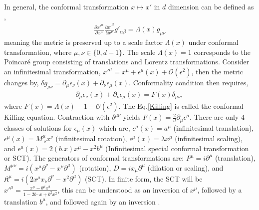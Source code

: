 \documentclass[%
 reprint,
superscriptaddress,
 amsmath,amssymb,
 aps,
]{revtex4-2}
\begin{document}
In general, the conformal transformation $x\longmapsto x'$ in $d$ dimension can be defined as \cite{Francesco,Blumenhagen}, 
\begin{align}
    \frac{\partial x'^{\alpha}}{\partial x^{\mu}}\frac{\partial x'^{\beta}}{\partial x^{\nu}}g'_{\alpha\beta}=\Lambda(x)g_{\mu\nu}
\end{align}
meaning the metric is preserved up to a scale factor $\Lambda(x)$ under conformal transformation, where $\mu,\nu\in\{0,d-1\}$. The scale $\Lambda(x)=1$ corresponds to the Poincar\'e group consisting of translations and Lorentz transformations. Consider an infinitesimal transformation, $x'^{\mu}=x^{\mu}+\epsilon^{\mu}(x)+\mathcal{O}(\epsilon^2)$, then the metric changes by, $\delta g_{\mu\nu}=\partial_{\mu}\epsilon_{\nu}(x)+\partial_{\nu}\epsilon_{\mu}(x)$. Conformality condition then requires, 
\begin{align}
    \partial_{\mu}\epsilon_{\nu}(x)+\partial_{\nu}\epsilon_{\mu}(x)=F(x)\delta_{\mu\nu},\label{Killing}
\end{align}
where $F(x)=\Lambda(x)-1-\mathcal{O}(\epsilon^2)$. The Eq.\eqref{Killing} is called the conformal Killing equation. Contraction with $\delta^{\mu\nu}$ yields $F(x)=\frac{2}{d}\partial_{\mu}\epsilon^{\mu}$. There are only 4 classes of solutions for $\epsilon_{\mu}(x)$ which are, $\epsilon^{\mu}(x)=a^{\mu}$ (infinitesimal translation), $\epsilon^{\mu}(x)=M^{\mu}_{~\nu}x^{\nu}$ (infinitesimal rotation), $\epsilon^{\mu}(x)=\lambda x^{\mu}$ (infinitesimal scaling), and $\epsilon^{\mu}(x)=2(b.x) x^{\mu}-x^2b^{\mu}$ (Infinitesimal special conformal transformation or SCT). The generators of conformal transformations are: $P^{{\mu}}=i\partial^{{\mu}}$ (translation), $M^{{\mu}{\nu}}=i\left(x^{{\mu}}\partial^{{\nu}}-x^{{\nu}}\partial^{{\mu}}\right)$ (rotation), $D=ix_{{\mu}}\partial^{{\mu}}$ (dilation or scaling), and $\mathfrak{K}^{{\mu}}=i\left(2x^{{\mu}}x_{{\nu}}\partial^{{\nu}}-x^2\partial^{{\mu}}\right)$ (SCT). In finite form, the SCT will be $x'^{\mu }={\frac {x^{\mu }-b^{\mu }x^{2}}{1-2b\cdot x+b^{2}x^{2}}}$, this can be understood as an inversion of $x^\mu$, followed by a translation $b^\mu$, and followed again by an inversion \cite{Blumenhagen}.
\end{document}
